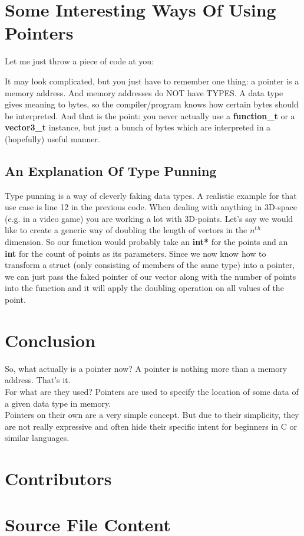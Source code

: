 \documentclass{article}
\begin{document}
  \newpage
  \section{Some Interesting Ways Of Using Pointers}
  Let me just throw a piece of code at you:
  
  It may look complicated, but you just have to remember one thing: a pointer is a memory address.
  And memory addresses do NOT have TYPES.
  A data type gives meaning to bytes, so the compiler/program knows how certain bytes should be interpreted.
  And that is the point: you never actually use a \textbf{function\_t} or a \textbf{vector3\_t} instance, but just a bunch of bytes which are interpreted in a (hopefully) useful manner.
  \subsection{An Explanation Of Type Punning}
  Type punning is a way of cleverly faking data types.
  A realistic example for that use case is line 12 in the previous code.
  When dealing with anything in 3D-space (e.g. in a video game) you are working a lot with 3D-points.
  Let's say we would like to create a generic way of doubling the length of vectors in the $n^t$$^h$ dimension.
  So our function would probably take an \textbf{int*} for the points and an \textbf{int} for the count of points as its parameters.
  Since we now know how to transform a struct (only consisting of members of the same type) into a pointer, we can just pass the faked pointer of our vector along with the number of points into the function and it will apply the doubling operation on all values of the point.
  \newpage
  \section{Conclusion}
  So, what actually is a pointer now?
  A pointer is nothing more than a memory address.
  That's it.
  \\For what are they used?
  Pointers are used to specify the location of some data of a given data type in memory.
  \\Pointers on their own are a very simple concept.
  But due to their simplicity, they are not really expressive and often hide their specific intent for beginners in C or similar languages.
  
  \newpage
  \section{Contributors}
  
  \newpage
  \section{Source File Content}
  
  
\end{document}
